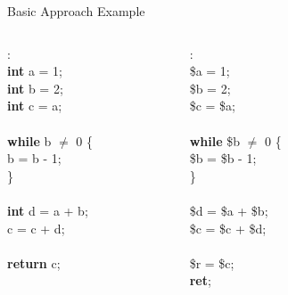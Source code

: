 \documentclass[aspectratio=169]{beamer}
\begin{document}
\begin{frame}{Basic Approach Example}
    \begin{columns}
        \begin{column}{1.5cm}
            \begin{algo}
                :\+
                \\ \textbf{int} a = 1;
                \\ \textbf{int} b = 2;
                \\ \textbf{int} c = a;
                \\
                \\ \textbf{while} b $\ne$ 0 \{\+
                \\ b = b - 1;\-
                \\ \}
                \\
                \\ \textbf{int} d = a + b;
                \\ c = c + d;
                \\
                \\ \textbf{return} c;
            \end{algo}
        \end{column}
        \begin{column}{2cm}
            \begin{algo}
                :\+
                \\ \$a = 1;
                \\ \$b = 2;
                \\ \$c = \$a;
                \\
                \\ \textbf{while} \$b $\ne$ 0 \{\+
                \\ \$b = \$b - 1;\-
                \\ \}
                \\
                \\ \$d = \$a + \$b;
                \\ \$c = \$c + \$d;
                \\
                \\ \$r = \$c;
                \\ \textbf{ret};
            \end{algo}
        \end{column}
        \begin{column}{3cm}
            \begin{algo}

\end{algo}
\end{column}
\end{columns}
\end{frame}
\end{document}
